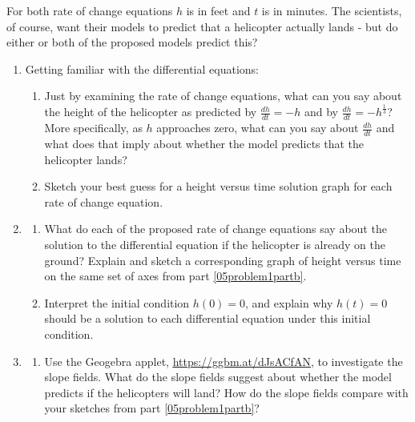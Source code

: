 For both rate of change equations $h$ is in feet and $t$ is in minutes. The scientists, of course, want their models to predict that a helicopter actually lands - but do either or both of the proposed models predict this? 
\begin{enumerate}
\item Getting familiar with the differential equations: \label{05problem1}

\begin{enumerate}
\item Just by examining the rate of change equations, what can you say about the height of the helicopter as predicted by $\displaystyle\frac{dh}{dt}=-h$  and by $\displaystyle\frac{dh}{dt}=-h^{\frac{1}{3}}$? More specifically, as $h$ approaches zero, what can you say about $\displaystyle\frac{dh}{dt}$ and what does that imply about whether the model predicts that the helicopter lands? \label{05problem1parta}
\vfill

\item Sketch your best guess for a height versus time solution graph for each rate of change equation. \label{05problem1partb}
\end{enumerate}
\vfill

\item	\label{05problem2}
\begin{enumerate}
\item What do each of the proposed rate of change equations say about the solution to the differential equation if the helicopter is already on the ground? Explain and sketch a corresponding graph of height versus time on the same set of axes from part \ref{05problem1partb}. \label{05problem2parta}
\vfill

\item Interpret the initial condition $h(0) = 0$, and explain why $h(t) = 0$ should be a solution to each differential equation under this initial condition. \label{05problem2partb}
\vfill
\end{enumerate}

\clearpage

\item 
\begin{enumerate}
\item Use the Geogebra applet, \href{https://ggbm.at/dJsACfAN}{\underline{https://ggbm.at/dJsACfAN}}, to investigate the slope fields. What do the slope fields suggest about whether the model predicts if the helicopters will land?  How do the slope fields compare with your sketches from part \ref{05problem1partb}? \label{05problem3}


\end{enumerate}
\end{enumerate}
